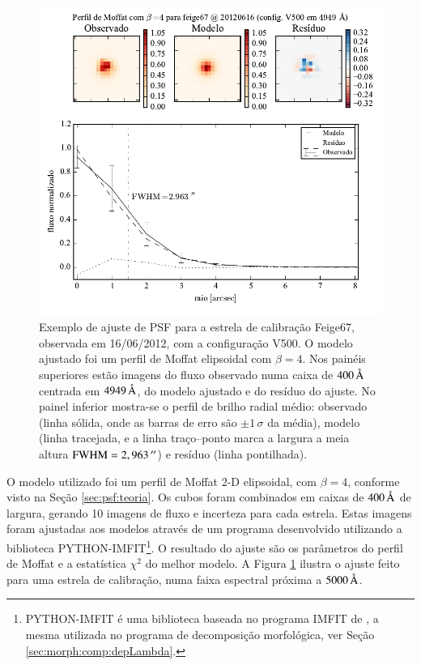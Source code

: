 \begin{figure}
	\includegraphics{figuras/PSFMoffatBeta4_exemplo}
	\caption[Exemplo de ajuste de PSF para estrela de calibração]
	{Exemplo de ajuste de PSF para a estrela de calibração Feige67, observada em
	16/06/2012, com a configuração V500. O modelo ajustado foi um perfil de
	Moffat elipsoidal com $\beta=4$. Nos painéis superiores estão imagens do fluxo
	observado numa caixa de $400\,\text{\normalfont\AA}$ centrada em $4949\,\text{\normalfont\AA}$,
	do modelo ajustado e do resíduo do ajuste. No painel inferior mostra-se o
	perfil de brilho radial médio: observado (linha sólida, onde as barras de erro
	são $\pm 1\,\sigma$ da média), modelo (linha tracejada, e a linha traço--ponto
	marca a largura a meia altura $\mathrm{FWHM}=2,963\,^{\prime\prime}$) e resíduo (linha
	pontilhada).}
	\label{fig:PSFExemplo}
\end{figure}

O modelo utilizado foi um perfil de Moffat 2-D elipsoidal, com $\beta\!=\!4$,
conforme visto na Seção \ref{sec:psf:teoria}. Os cubos foram combinados em
caixas de $400\,\text{\normalfont\AA}$ de largura, gerando 10 imagens de fluxo e incerteza
para cada estrela. Estas imagens foram ajustadas aos modelos através de um
programa desenvolvido utilizando a biblioteca PYTHON-IMFIT\footnote{PYTHON-IMFIT
é uma biblioteca baseada no programa IMFIT de \citet{Erwin2015}, a mesma
utilizada no programa de decomposição morfológica, ver Seção
\ref{sec:morph:comp:depLambda}.}. O resultado do ajuste são os parâmetros do
perfil de Moffat e a estatística $\chi^2$ do melhor modelo. A Figura
\ref{fig:PSFExemplo} ilustra o ajuste feito para uma estrela de calibração, numa
faixa espectral próxima a $5000\,\text{\normalfont\AA}$.

